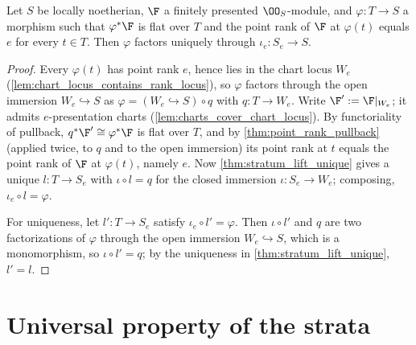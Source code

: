 \begin{theorem}
  \label{thm:factor_rank_stratum_unique}
  \leanok
  Let \(S\) be locally noetherian, \(\F\) a finitely presented
  \(\OO_S\)-module, and \(\varphi : T \to S\) a morphism such that
  \(\varphi^*\F\) is flat over \(T\) and the point rank of \(\F\) at
  \(\varphi(t)\) equals \(e\) for every \(t \in T\).  Then \(\varphi\)
  factors uniquely through \(\iota_e : S_e \to S\).
\end{theorem}

\begin{proof}
  \leanok
  Every \(\varphi(t)\) has point rank \(e\), hence lies in the chart locus
  \(W_e\) (\cref{lem:chart_locus_contains_rank_locus}), so \(\varphi\)
  factors through the open immersion \(W_e \hookrightarrow S\) as
  \(\varphi = (W_e \hookrightarrow S) \circ q\) with \(q : T \to W_e\).
  Write \(\F' := \F|_{W_e}\); it admits \(e\)-presentation charts
  (\cref{lem:charts_cover_chart_locus}).  By functoriality of pullback,
  \(q^*\F' \cong \varphi^*\F\) is flat over \(T\), and by
  \cref{thm:point_rank_pullback} (applied twice, to \(q\) and to the open
  immersion) its point rank at \(t\) equals the point rank of \(\F\) at
  \(\varphi(t)\), namely \(e\).  Now \cref{thm:stratum_lift_unique} gives a
  unique \(l : T \to S_e\) with \(\iota \circ l = q\) for the closed
  immersion \(\iota : S_e \to W_e\); composing,
  \(\iota_e \circ l = \varphi\).

  For uniqueness, let \(l' : T \to S_e\) satisfy
  \(\iota_e \circ l' = \varphi\).  Then \(\iota \circ l'\) and \(q\) are two
  factorizations of \(\varphi\) through the open immersion
  \(W_e \hookrightarrow S\), which is a monomorphism, so
  \(\iota \circ l' = q\); by the uniqueness in
  \cref{thm:stratum_lift_unique}, \(l' = l\).
\end{proof}

\section{Universal property of the strata}
\label{sec:flatstrat_universal}

